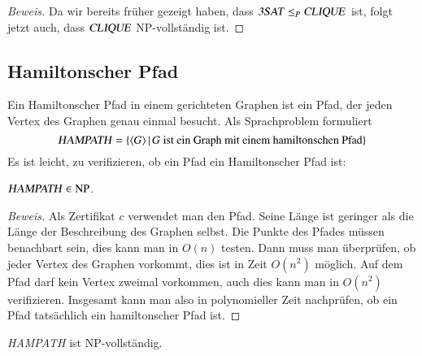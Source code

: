 \begin{proof}[Beweis]
Da wir bereits früher gezeigt haben, dass
$\text{\textsl{3SAT}}\le_P\text{\textsl{CLIQUE}}$ ist, folgt jetzt auch,
dass $\text{\textsl{CLIQUE}}$ NP-vollständig ist.
\end{proof}

\subsection{Hamiltonscher Pfad}
Ein Hamiltonscher Pfad in einem gerichteten Graphen ist ein Pfad, der jeden
Vertex des Graphen genau einmal besucht. Als Sprachproblem formuliert 
\[
\text{\textsl{HAMPATH}}
=\{\langle G\rangle\,|\,\text{$G$ ist ein Graph mit einem hamiltonschen Pfad}\}
\]
Es ist leicht, zu verifizieren, ob
ein Pfad ein Hamiltonscher Pfad ist:
\begin{satz} $\text{\textsl{HAMPATH}}\in\text{NP}$.
\end{satz}

\begin{proof}[Beweis]
Als Zertifikat $c$ verwendet man den Pfad. Seine Länge ist geringer
als die Länge der Beschreibung des Graphen selbst.
Die Punkte des Pfades müssen benachbart sein, dies kann man in 
$O(n)$ testen.
Dann muss man überprüfen, ob jeder Vertex des Graphen vorkommt,
dies ist in Zeit $O(n^2)$ möglich. Auf dem Pfad darf kein Vertex
zweimal vorkommen, auch dies kann man in $O(n^2)$ verifizieren.
Insgesamt kann man also in polynomieller Zeit nachprüfen, ob ein
Pfad tatsächlich ein hamiltonscher Pfad ist.
\end{proof}

\begin{satz} \textsl{HAMPATH} ist NP-vollständig.
\end{satz}

